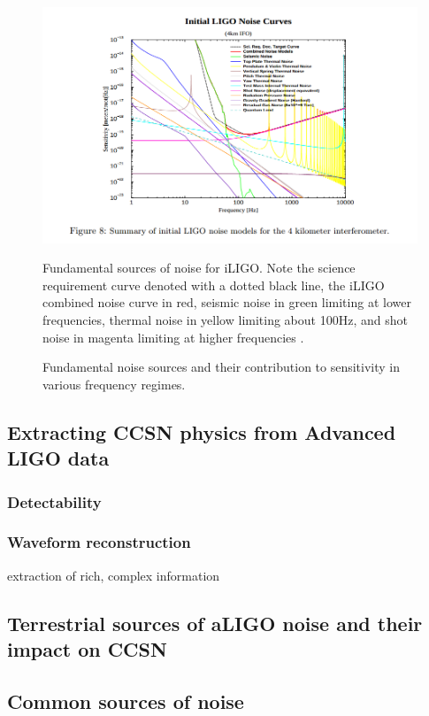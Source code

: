 \begin{figure} 
\centering
\includegraphics[width=\linewidth]{figures/iLIGO_noise_curve.png}
\caption{Fundamental sources of noise for iLIGO. Note the science requirement curve denoted with a dotted black line, the iLIGO combined noise curve in red, seismic noise in green limiting at lower frequencies, thermal noise in yellow limiting about 100Hz, and shot noise in magenta limiting at higher frequencies \cite{iLIGO_poster}.} 
\label{fig:iLIGO_noise}
\caption{Fundamental noise sources and their contribution to sensitivity in various frequency regimes.}
\label{fig:iLIGO} 
\end{figure}

\subsection{Extracting CCSN physics from Advanced LIGO data} 
\subsubsection{Detectability} 
\subsubsection{Waveform reconstruction}
extraction of rich, complex information

\subsection{Terrestrial sources of aLIGO noise and their impact on CCSN}
\subsection{Common sources of noise} 
